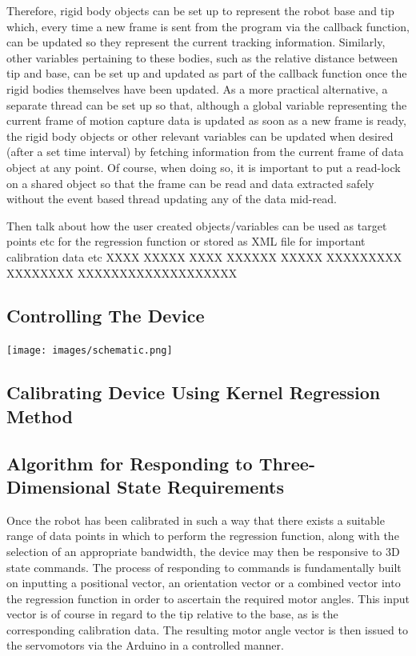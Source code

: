 \documentclass[11pt]{article}
\begin{document}
Therefore, rigid body objects can be set up to represent the robot base and tip which, every time a new frame is sent from the program via the callback function, can be updated so they represent the current tracking information. Similarly, other variables pertaining to these bodies, such as the relative distance between tip and base, can be set up and updated as part of the callback function once the rigid bodies themselves have been updated. As a more practical alternative, a separate thread can be set up so that, although a global variable representing the current frame of motion capture data is updated as soon as a new frame is ready, the rigid body objects or other relevant variables can be updated when desired (after a set time interval) by fetching information from the current frame of data object at any point. Of course, when doing so, it is important to put a read-lock on a shared object so that the frame can be read and data extracted safely without the event based thread updating any of the data mid-read.

Then talk about how the user created objects/variables can be used as target points etc for the regression function or stored as XML file for important calibration data etc XXXX XXXXX XXXX XXXXXX XXXXX XXXXXXXXX XXXXXXXX XXXXXXXXXXXXXXXXXXX

\subsection{Controlling The Device}

\begin{center}
\texttt{[image: images/schematic.png]}
\label{figure:schematic}
\end{center}

\subsection{Calibrating Device Using Kernel Regression Method}
\pagebreak 
\subsection{Algorithm for Responding to Three-Dimensional State Requirements}
Once the robot has been calibrated in such a way that there exists a suitable range of data points in which to perform the regression function, along with the selection of an appropriate bandwidth, the device may then be responsive to 3D state commands.
The process of responding to commands is fundamentally built on inputting a positional vector, an orientation vector or a combined vector into the regression function in order to ascertain the required motor angles. This input vector is of course in regard to the tip relative to the base, as is the corresponding calibration data. The resulting motor angle vector is then issued to the servomotors via the Arduino in a controlled manner. 
\end{document}
